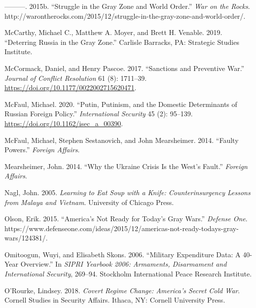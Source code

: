 \documentclass[
]{article}
\begin{document}
\leavevmode\hypertarget{ref-mazarr_strugglegrayzone_2015}{}%
---------. 2015b. ``Struggle in the Gray Zone and World Order.'' \emph{War on the Rocks}. http://warontherocks.com/2015/12/struggle-in-the-gray-zone-and-world-order/.

\leavevmode\hypertarget{ref-mccarthy_deterringrussiagray_2019}{}%
McCarthy, Michael C., Matthew A. Moyer, and Brett H. Venable. 2019. ``Deterring Russia in the Gray Zone.'' Carlisle Barracks, PA: Strategic Studies Institute.

\leavevmode\hypertarget{ref-mccormack_sanctionspreventivewar_2017}{}%
McCormack, Daniel, and Henry Pascoe. 2017. ``Sanctions and Preventive War.'' \emph{Journal of Conflict Resolution} 61 (8): 1711--39. \url{https://doi.org/10.1177/0022002715620471}.

\leavevmode\hypertarget{ref-mcfaul_putinputinismdomestic_2020}{}%
McFaul, Michael. 2020. ``Putin, Putinism, and the Domestic Determinants of Russian Foreign Policy.'' \emph{International Security} 45 (2): 95--139. \url{https://doi.org/10.1162/isec_a_00390}.

\leavevmode\hypertarget{ref-mcfaul_faultypowers_2014}{}%
McFaul, Michael, Stephen Sestanovich, and John Mearsheimer. 2014. ``Faulty Powers.'' \emph{Foreign Affairs}.

\leavevmode\hypertarget{ref-mearsheimer_whyukrainecrisis_2014}{}%
Mearsheimer, John. 2014. ``Why the Ukraine Crisis Is the West's Fault.'' \emph{Foreign Affairs}.

\leavevmode\hypertarget{ref-nagl_learningeatsoup_2005}{}%
Nagl, John. 2005. \emph{Learning to Eat Soup with a Knife: Counterinsurgency Lessons from Malaya and Vietnam}. University of Chicago Press.

\leavevmode\hypertarget{ref-olson_americanotready_2015}{}%
Olson, Erik. 2015. ``America's Not Ready for Today's Gray Wars.'' \emph{Defense One}. https://www.defenseone.com/ideas/2015/12/americas-not-ready-todays-gray-wars/124381/.

\leavevmode\hypertarget{ref-omitoogun_militaryexpendituredata_2006}{}%
Omitoogun, Wuyi, and Elisabeth Skons. 2006. ``Military Expenditure Data: A 40-Year Overview.'' In \emph{SIPRI Yearbook 2006: Armaments, Disarmament and International Security}, 269--94. Stockholm International Peace Research Institute.

\leavevmode\hypertarget{ref-orourke_covertregimechange_2018}{}%
O'Rourke, Lindsey. 2018. \emph{Covert Regime Change: America's Secret Cold War}. Cornell Studies in Security Affairs. Ithaca, NY: Cornell University Press.
\end{document}
